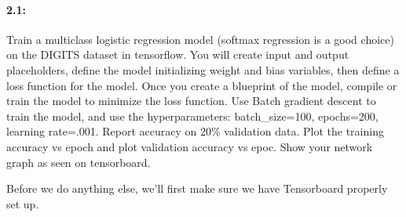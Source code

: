 \documentclass[11pt]{article}
\begin{document}
    \hypertarget{section}{%
\paragraph{2.1:}\label{section}}

Train a multiclass logistic regression model (softmax regression is a
good choice) on the DIGITS dataset in tensorflow. You will create input
and output placeholders, define the model initializing weight and bias
variables, then define a loss function for the model. Once you create a
blueprint of the model, compile or train the model to minimize the loss
function. Use Batch gradient descent to train the model, and use the
hyperparameters: batch\_size=100, epochs=200, learning rate=.001. Report
accuracy on 20\% validation data. Plot the training accuracy vs epoch
and plot validation accuracy vs epoc. Show your network graph as seen on
tensorboard.

    Before we do anything else, we'll first make sure we have Tensorboard
properly set up.
\end{document}
